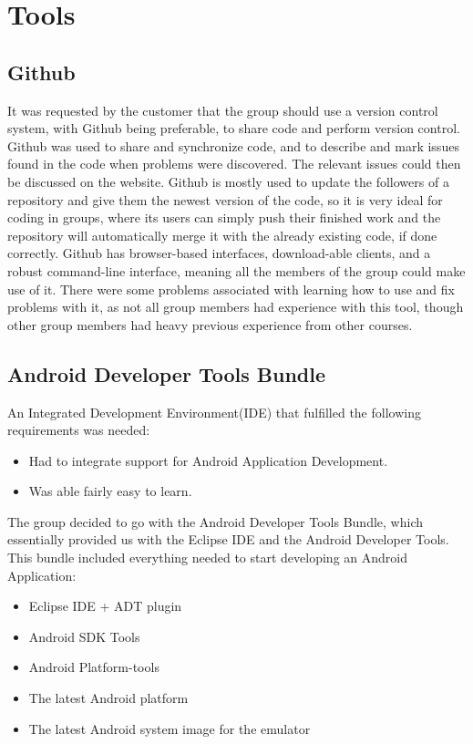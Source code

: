 \chapter{Tools}

\section{Github} 
\label{def:github}
\label{def:githubDev}
It was requested by the customer that the group should use a version control system, with Github being preferable, to share code and perform version control. Github was used to share and synchronize code, and to describe and mark issues found in the code when problems were discovered. The relevant issues could then be discussed on the website.  Github is mostly used to update the followers of a repository and give them the newest version of the code, so it is  very ideal for coding in groups, where its users can simply push their finished work and the repository will automatically merge it with the already existing code, if done correctly.  Github has browser-based interfaces, download-able clients, and a robust command-line interface, meaning all the members of the group could make use of it. There were some problems associated with learning how to use and fix problems with it, as not all group members had experience with this tool, though other group members had heavy previous experience from other courses.

\section{Android Developer Tools Bundle}
An Integrated Development Environment(IDE) that fulfilled the following requirements was needed:
\begin{itemize}
\item Had to integrate support for Android Application Development.
\item Was able fairly easy to learn. 
\end{itemize}
The group decided to go with the Android Developer Tools Bundle, which essentially provided us with the Eclipse IDE and the Android Developer Tools. This bundle included everything needed to start developing an Android Application:
\begin{itemize}
\item Eclipse IDE + ADT plugin
\item Android SDK Tools
\item Android Platform-tools
\item The latest Android platform
\item The latest Android system image for the emulator
\end{itemize}

